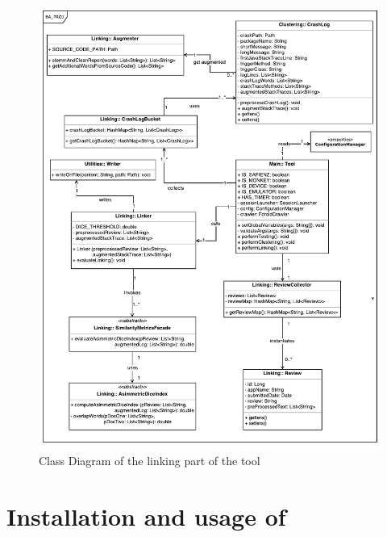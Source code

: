 \begin{figure}[t]
\centering 
\includegraphics[width=\columnwidth]{diagrams/linking.pdf} 
\caption{Class Diagram of the linking part of the tool }
\label{linking}
\vspace{-3mm} 
\end{figure}


\section{Installation and usage of \toolname}







